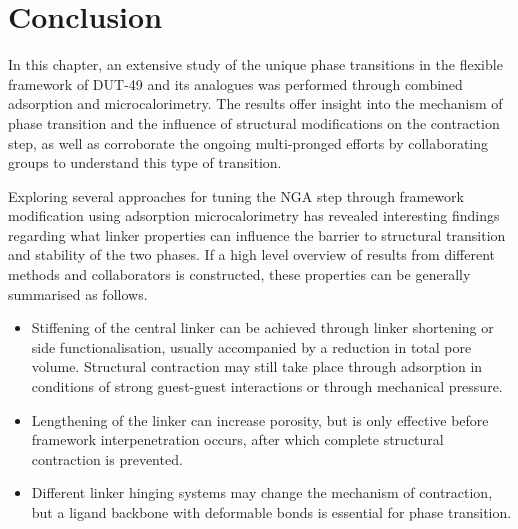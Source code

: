 
\section{Conclusion}

In this chapter, an extensive study of the unique phase transitions
in the flexible framework of DUT-49 and its analogues was performed
through combined adsorption and microcalorimetry.
The results offer insight into the mechanism of phase transition
and the influence of structural modifications on the contraction step,
as well as corroborate the ongoing multi-pronged efforts 
by collaborating groups to understand this type of transition.

Exploring several approaches for tuning the \gls{NGA} step through
framework modification using adsorption microcalorimetry has revealed
interesting findings regarding what linker properties can
influence the barrier to structural transition and stability of the
two phases. If a high level overview of results from different methods
and collaborators is constructed, these properties can be generally summarised
as follows.

\begin{itemize}
    \item Stiffening of the central linker can be achieved through 
    linker shortening or side functionalisation, usually accompanied 
    by a reduction in total pore volume. Structural contraction may 
    still take place through adsorption in conditions of strong 
    guest-guest interactions or through mechanical pressure.
    \item Lengthening of the linker can increase porosity,
    but is only effective before framework interpenetration 
    occurs, after which complete structural contraction is 
    prevented.
    \item Different linker hinging systems may change 
    the mechanism of contraction, but a ligand backbone with 
    deformable bonds is essential for phase transition.
\end{itemize}

